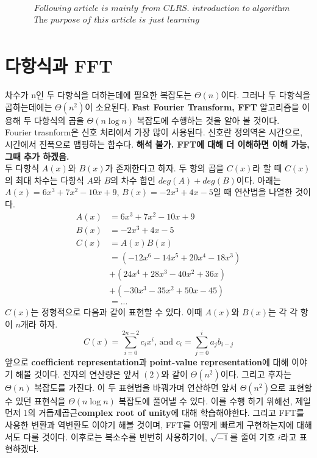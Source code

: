 \documentclass{article}
\begin{document}
\begin{align*}
    &\textit{Following article is mainly from CLRS. introduction to algorithm}\\
    &\textit{The purpose of this article is just learning}\\
\end{align*}
\section{다항식과 FFT}
차수가 n인 두 다항식을 더하는데에 필요한 복잡도는 $\Theta (n)$이다. 그러나 두 다항식을 곱하는데에는 $\Theta (n^2)$이 소요된다. \textbf{Fast Fourier Transform, FFT} 알고리즘을 이용해 두 다항식의 곱을 $\Theta (n \log n)$ 복잡도에 수행하는 것을 알아 볼 것이다. 
\\

Fourier trasnform은 신호 처리에서 가장 많이 사용된다. 신호란 정의역은 시간으로, 시간에서 진폭으로 맵핑하는 함수다. \textbf{ 해석 불가. FFT에 대해 더 이해하면 이해 가능, 그때 추가 하겠음. }\\

두 다항식 $A(x)$와 $B(x)$가 존재한다고 하자. 두 항의 곱을 $C(x)$라 할 때 $C(x)$의 최대 차수는 다항식 $A$와 $B$의 차수 합인 $deg(A) + deg(B)$이다. 아래는 $A(x) = 6x^3+7x^2-10x+9$, $B(x) = -2x^3+4x-5$일 때 연산법을 나열한 것이다.\\
\begin{align*}
    A(x) &= 6x^3 + 7x^2 - 10x + 9\\
    B(x) &= -2x^3 + 4x - 5\\
    C(x) &= A(x)B(x)  \\
    &= (-12x^6 - 14x^5 + 20x^4 - 18x^3)\\
    &+(24x^4 + 28x^3 - 40x^2 + 36x)\\
    &+(-30x^3 - 35x^2 + 50x - 45)\\
    &=...\tag{1}
\end{align*}
$C(x)$는 정형적으로 다음과 같이 표현할 수 있다. 이때 $A(x)$와 $B(x)$는 각 각 항이 $n$개라 하자.\\
\[
C(x)=\sum_{i=0}^{2n-2}c_ix^i \text{, and } c_i = \sum_{j=0}^{i}a_jb_{i-j}\tag{2}
\]
앞으로 \textbf{coefficient representation}과 \textbf{point-value representation}에 대해 이야기 해볼 것이다. 전자의 연산량은 앞서 $(2)$와 같이 $\Theta (n^2)$이다. 그리고 후자는 $\Theta (n)$ 복잡도를 가진다. 이 두 표현법을 바꿔가며 연산하면 앞서 $\Theta (n^2)$으로 표현할 수 있던 표현식을 $\Theta (n \log n)$ 복잡도에 풀어낼 수 있다. 이를 수행 하기 위해선, 제일 먼저 1의 거듭제곱근\textbf{complex root of unity}에 대해 학습해야한다. 그리고 FFT를 사용한 변환과 역변환도 이야기 해볼 것이며, FFT를 어떻게 빠르게 구현하는지에 대해서도 다룰 것이다. 이후로는 복소수를 빈번히 사용하기에, 
$\sqrt{-1}$를 줄여 기호 $i$라고 표현하겠다.
\end{document}
